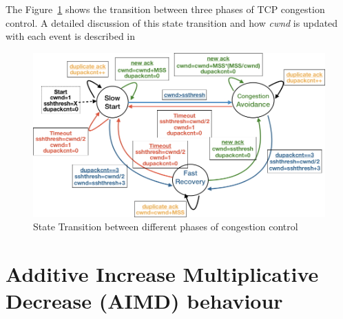 \begin{multicols}{2}
The Figure~\ref{chap2-fig04} shows the transition between three phases of TCP congestion control. A detailed discussion of this state transition and how \textit{cwnd} is updated with each event is described in \cite{art2-key03}
\begin{figure}[H]
\centering
\includegraphics[scale=1.05]{src/Figures/chap2/chap2-fig04.jpg}
\caption{State Transition between different phases of congestion control}\label{chap2-fig04}
\end{figure}

\section{Additive Increase Multiplicative Decrease (AIMD) behaviour}


\end{multicols}
